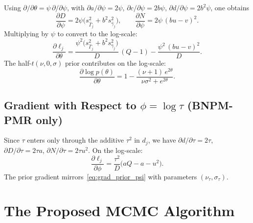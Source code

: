 \documentclass[12pt, a4paper]{article}
\theoremstyle{remark}
\begin{document}
Using $\partial/\partial\theta = \psi\,\partial/\partial\psi$,
with $\partial a/\partial\psi = 2\psi$, $\partial c/\partial\psi = 2b\psi$,
$\partial d/\partial\psi = 2b^2\psi$, one obtains
\begin{equation}
  \frac{\partial D}{\partial\psi}
  = 2\psi\bigl(s^2_{\hat\Gamma_j} + b^2 s^2_{\hat\gamma_j}\bigr),
  \qquad
  \frac{\partial N}{\partial\psi}
  = 2\psi\,(bu - v)^2.
\end{equation}
Multiplying by $\psi$ to convert to the log-scale:
\begin{equation}
  \boxed{
  \frac{\partial \ell_j}{\partial\theta}
  = \frac{\psi^2\bigl(s^2_{\hat\Gamma_j} + b^2 s^2_{\hat\gamma_j}\bigr)}{D}
    \,(Q - 1)
    - \frac{\psi^2\,(bu - v)^2}{D}.
  }
\label{eq:grad_theta}
\end{equation}
The half-$t(\nu,0,\sigma)$ prior contributes on the log-scale:
\begin{equation}
  \frac{\partial\log p(\theta)}{\partial\theta}
  = 1 - \frac{(\nu+1)\,e^{2\theta}}{\nu\sigma^2 + e^{2\theta}}.
\label{eq:grad_prior_psi}
\end{equation}

\subsection{Gradient with Respect to
  \texorpdfstring{$\phi = \log\tau$}{phi} (BNPM-PMR only)}

Since $\tau$ enters only through the additive $\tau^2$ in $d_j$,
we have $\partial d/\partial\tau = 2\tau$,
$\partial D/\partial\tau = 2\tau a$,
$\partial N/\partial\tau = 2\tau u^2$.  On the log-scale:
\begin{equation}
  \boxed{
  \frac{\partial \ell_j}{\partial\phi}
  = \frac{\tau^2}{D}\bigl(aQ - a - u^2\bigr).
  }
\label{eq:grad_phi}
\end{equation}
The prior gradient mirrors~\eqref{eq:grad_prior_psi} with parameters
$(\nu_\tau, \sigma_\tau)$.

\section{The Proposed MCMC Algorithm}

\end{document}
